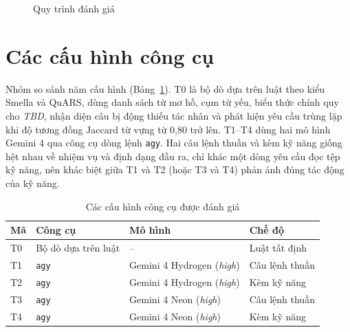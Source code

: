 \documentclass[12pt,a4paper]{report}
\begin{document}
\begin{figure}[H]
\centering
{}
\caption{Quy trình đánh giá}
\label{fig:method_pipeline}
\end{figure}

\section{Các cấu hình công cụ}
\label{sec:tools}
Nhóm so sánh năm cấu hình (Bảng~\ref{tab:tools}). T0 là bộ dò dựa trên luật theo kiểu Smella và QuARS, dùng danh sách từ mơ hồ, cụm từ yếu, biểu thức chính quy cho \textit{TBD}, nhận diện câu bị động thiếu tác nhân và phát hiện yêu cầu trùng lặp khi độ tương đồng Jaccard từ vựng từ 0,80 trở lên. T1--T4 dùng hai mô hình Gemini 4 qua công cụ dòng lệnh \texttt{agy}. Hai câu lệnh thuần và kèm kỹ năng giống hệt nhau về nhiệm vụ và định dạng đầu ra, chỉ khác một dòng yêu cầu đọc tệp kỹ năng, nên khác biệt giữa T1 và T2 (hoặc T3 và T4) phản ánh đúng tác động của kỹ năng.

\begin{table}[H]
\centering
\caption{Các cấu hình công cụ được đánh giá}
\label{tab:tools}
\small
\begin{tabular}{llll}
\toprule
\textbf{Mã} & \textbf{Công cụ} & \textbf{Mô hình} & \textbf{Chế độ} \\
\midrule
T0 & Bộ dò dựa trên luật & -- & Luật tất định \\
T1 & \texttt{agy} & Gemini 4 Hydrogen (\textit{high}) & Câu lệnh thuần \\
T2 & \texttt{agy} & Gemini 4 Hydrogen (\textit{high}) & Kèm kỹ năng \\
T3 & \texttt{agy} & Gemini 4 Neon (\textit{high}) & Câu lệnh thuần \\
T4 & \texttt{agy} & Gemini 4 Neon (\textit{high}) & Kèm kỹ năng \\
\bottomrule
\end{tabular}
\end{table}
\end{document}
